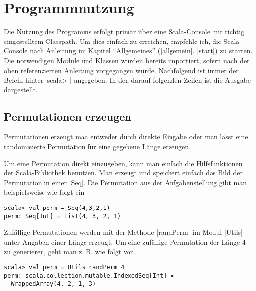 \section{Programmnutzung}
\lstset{basicstyle=\ttfamily}
Die Nutzung des Programms erfolgt primär über eine Scala-Console mit richtig eingestelltem Classpath.
Um dies einfach zu erreichen, empfehle ich, die Scala-Console nach Anleitung im Kapitel ``Allgemeines'' (\ref{allgemein}. \ref{start}) zu starten.
Die notwendigen Module und Klassen wurden bereits importiert, sofern nach der oben referenzierten Anleitung vorgegangen wurde.
Nachfolgend ist immer der Befehl hinter |scala> | angegeben. In den darauf folgenden Zeilen ist die Ausgabe dargestellt.
\subsection{Permutationen erzeugen}
Permutationen erzeugt man entweder durch direkte Eingabe oder man lässt eine randomisierte Permutation für eine gegebene Länge erzeugen.

Um eine Permutation direkt einzugeben, kann man einfach die Hilfsfunktionen der Scala-Bibliothek benutzen.
Man erzeugt und speichert einfach das Bild der Permutation in einer |Seq|. Die Permutation aus der Aufgabenstellung gibt man beispielsweise wie folgt ein.
\begin{lstlisting}
scala> val perm = Seq(4,3,2,1)
perm: Seq[Int] = List(4, 3, 2, 1)  
\end{lstlisting}
Zufällige Permutationen werden mit der Methode |randPerm| im Modul |Utils| unter Angaben einer Länge erzeugt.
Um eine zufällige Permutation der Länge 4 zu generieren, geht man z. B. wie folgt vor.
\begin{lstlisting}
scala> val perm = Utils randPerm 4                                                                                                 
perm: scala.collection.mutable.IndexedSeq[Int] =
  WrappedArray(4, 2, 1, 3)  
\end{lstlisting}
